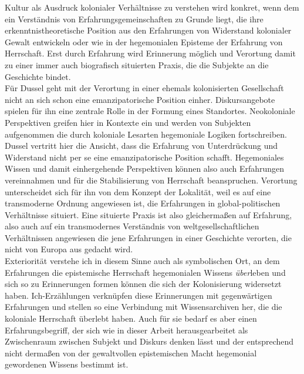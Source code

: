 Kultur als Ausdruck kolonialer Verhältnisse zu verstehen wird konkret, wenn dem
ein Verständnis von Erfahrungsgemeinschaften zu Grunde liegt, die ihre
erkenntnistheoretische Position aus den Erfahrungen von Widerstand kolonialer
Gewalt entwickeln oder wie in der hegemonialen Episteme der Erfahrung von
Herrschaft. Erst durch Erfahrung wird Erinnerung möglich und Verortung damit zu
einer immer auch biografisch situierten Praxis, die die Subjekte an die
Geschichte bindet. \\
Für Dussel geht mit der Verortung in einer ehemals
kolonisierten Gesellschaft nicht an sich schon eine emanzipatorische Position
einher. Diskursangebote spielen für ihn eine zentrale Rolle in der Formung eines
Standortes. Neokoloniale Perspektiven greifen hier in Kontexte ein und werden
von Subjekten aufgenommen die durch koloniale Lesarten hegemoniale Logiken
fortschreiben. \\
Dussel vertritt hier die Ansicht, dass die Erfahrung von
Unterdrückung und Widerstand nicht per se eine emanzipatorische Position
schafft. Hegemoniales Wissen und damit einhergehende Perspektiven können also
auch Erfahrungen vereinnahmen und für die Stabilisierung von Herrschaft
beanspruchen. Verortung unterscheidet sich für ihn von dem Konzept der
Lokalität, weil es auf eine transmoderne Ordnung angewiesen ist, die Erfahrungen
in global-politischen Verhältnisse situiert. Eine situierte Praxis ist also
gleichermaßen auf Erfahrung, also auch auf ein transmodernes Verständnis von
weltgesellschaftlichen Verhältnissen angewiesen die jene Erfahrungen in einer
Geschichte verorten, die nicht von Europa aus gedacht wird.
\\

Exteriorität verstehe ich in diesem Sinne auch als symbolischen Ort, an dem
Erfahrungen die epistemische Herrschaft hegemonialen Wissens \textit{über}leben und sich
so zu Erinnerungen formen können die sich der Kolonisierung widersetzt haben.
Ich-Erzählungen verknüpfen diese Erinnerungen mit gegenwärtigen Erfahrungen und
stellen so eine Verbindung mit Wissensarchiven her, die die koloniale Herrschaft
überlebt haben. Auch für sie bedarf es aber einen Erfahrungsbegriff, der sich
wie in dieser Arbeit herausgearbeitet als Zwischenraum zwischen Subjekt und
Diskurs denken lässt und der entsprechend nicht dermaßen von der gewaltvollen
epistemischen Macht hegemonial gewordenen Wissens bestimmt ist. 

